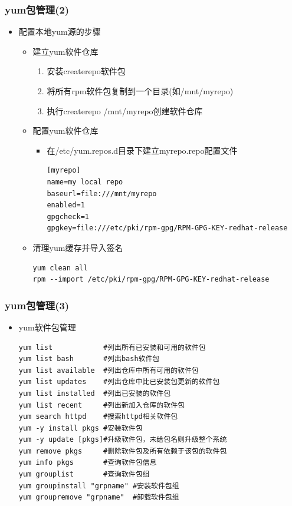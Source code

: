 \documentclass[xcolor=svgnames,presentation]{beamer}
\begin{document}
\begin{frame}[fragile]
\frametitle{yum包管理(2)}
\label{sec-3-10}
\begin{itemize}

\item 配置本地yum源的步骤
\label{sec-3-10-1}%
\begin{itemize}

\item 建立yum软件仓库
\label{sec-3-10-1-1}%
\begin{enumerate}
\item 安装createrepo软件包
\item 将所有rpm软件包复制到一个目录(如/mnt/myrepo)
\item 执行createrepo /mnt/myrepo创建软件仓库
\end{enumerate}

\item 配置yum软件仓库
\label{sec-3-10-1-2}%
\begin{itemize}

\item 在/etc/yum.repos.d目录下建立myrepo.repo配置文件\\
\label{sec-3-10-1-2-1}%
\begin{verbatim}
[myrepo]
name=my local repo
baseurl=file:///mnt/myrepo
enabled=1
gpgcheck=1
gpgkey=file:///etc/pki/rpm-gpg/RPM-GPG-KEY-redhat-release
\end{verbatim}
\end{itemize} %

\item 清理yum缓存并导入签名\\
\label{sec-3-10-1-3}%
\begin{verbatim}
yum clean all
rpm --import /etc/pki/rpm-gpg/RPM-GPG-KEY-redhat-release
\end{verbatim}
\end{itemize} %
\end{itemize} %
\end{frame}
\begin{frame}[fragile]
\frametitle{yum包管理(3)}
\label{sec-3-11}
\begin{itemize}

\item yum软件包管理\\
\label{sec-3-11-1}%
\begin{verbatim}
yum list            #列出所有已安装和可用的软件包
yum list bash       #列出bash软件包
yum list available  #列出仓库中所有可用的软件包
yum list updates    #列出仓库中比已安装包更新的软件包
yum list installed  #列出已安装的软件包
yum list recent     #列出新加入仓库的软件包
yum search httpd    #搜索httpd相关软件包
yum -y install pkgs #安装软件包
yum -y update [pkgs]#升级软件包，未给包名则升级整个系统
yum remove pkgs     #删除软件包及所有依赖于该包的软件包
yum info pkgs       #查询软件包信息
yum grouplist       #查询软件包组
yum groupinstall "grpname" #安装软件包组
yum groupremove "grpname"  #卸载软件包组
\end{verbatim}
\end{itemize} %
\end{frame}
\end{document}
